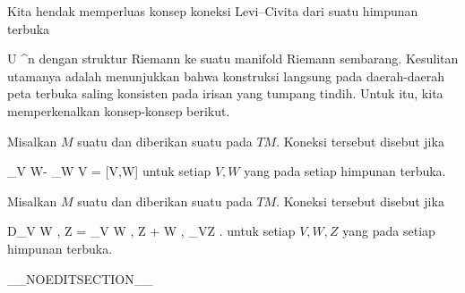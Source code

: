 
Kita hendak memperluas konsep koneksi Levi--Civita dari suatu himpunan terbuka

\mavergleichskette
{\vergleichskette
{ U
}
{ \subseteq }{ \R^n
}
{  }{
}
{    }{
}
{   }{
}
}
{}{}{}
dengan struktur Riemann ke suatu manifold Riemann sembarang. Kesulitan utamanya adalah menunjukkan bahwa konstruksi langsung pada daerah-daerah peta terbuka saling konsisten pada irisan yang tumpang tindih. Untuk itu, kita memperkenalkan konsep-konsep berikut.

{}
{

Misalkan $M$ suatu
dan diberikan suatu
pada
$TM$. Koneksi tersebut disebut
jika

\mavergleichskettedisp
{\vergleichskette
{ \nabla_V W- \nabla_W V
}
{ =} { [V,W]
}
{ } {
}
{ } {
}
{ } {
}
}
{}{}{}
untuk setiap
$V,W$ yang
pada setiap himpunan terbuka.

}

{}
{

Misalkan $M$ suatu
dan diberikan suatu
pada
$TM$. Koneksi tersebut disebut
jika

\mavergleichskettedisp
{\vergleichskette
{ D_V \left\langle  W  ,  Z  \right\rangle
}
{ =} { \left\langle \nabla_V W , Z  \right\rangle  + \left\langle  W  ,  \nabla_VZ  \right\rangle
}
{ } {
}
{ } {
}
{ } {
}
}
{}{}{.}
untuk setiap
$V,W,Z$ yang
pada setiap himpunan terbuka.

}

__NOEDITSECTION__

